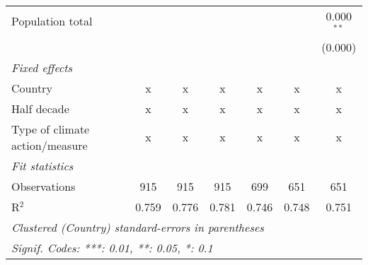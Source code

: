 \begin{tabular}{lcccccc}
   Population total                                                       &         &                &                &                &                & 0.000$^{**}$\\   
                                                                          &         &                &                &                &                & (0.000)\\   
   \emph{Fixed effects}\\
   Country                                                                & x       & x              & x              & x              & x              & x\\  
   Half decade                                                            & x       & x              & x              & x              & x              & x\\  
   Type of climate action/measure                                         & x       & x              & x              & x              & x              & x\\  
   \midrule \emph{Fit statistics}\\
   Observations                                                           & 915     & 915            & 915            & 699            & 651            & 651\\  
   R$^2$                                                                  & 0.759   & 0.776          & 0.781          & 0.746          & 0.748          & 0.751\\  
   \midrule
   \multicolumn{7}{l}{\emph{Clustered (Country) standard-errors in parentheses}}\\
   \multicolumn{7}{l}{\emph{Signif. Codes: ***: 0.01, **: 0.05, *: 0.1}}\\
\end{tabular}
\par\endgroup


